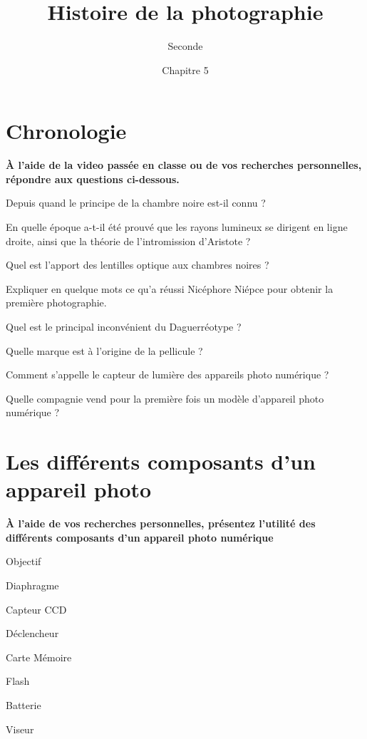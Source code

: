 \documentclass{exos}
\title{Histoire de la photographie}
\author{Seconde}
\date{Chapitre 5}
\begin{document}
\maketitle
\section{Chronologie}
\begin{tcolorbox}
\textbf{À l'aide de la video passée en classe ou de vos recherches personnelles, répondre aux questions ci-dessous.}
\end{tcolorbox}
\begin{alphaquestions}
\item Depuis quand le principe de la chambre noire est-il connu ?
\item En quelle époque a-t-il été prouvé que les rayons lumineux se dirigent en ligne droite, ainsi que la théorie de l'intromission d'Aristote ?
\item Quel est l'apport des lentilles optique aux chambres noires ?
\item Expliquer en quelque mots ce qu'a réussi Nicéphore Niépce pour obtenir la première photographie.
\item Quel est le principal inconvénient du Daguerréotype ?
\item Quelle marque est à l'origine de la pellicule ?
\item Comment s'appelle le capteur de lumière des appareils photo numérique ?
\item Quelle compagnie vend pour la première fois un modèle d'appareil photo numérique ?
\end{alphaquestions}
\section{Les différents composants d'un appareil photo}
\begin{tcolorbox}
\textbf{À l'aide de vos recherches personnelles, présentez l'utilité des différents composants d'un appareil photo numérique}
\end{tcolorbox}
\begin{alphaquestions}
\begin{minipage}{0.45\textwidth}
\item Objectif
\item Diaphragme
\item Capteur CCD
\item Déclencheur
\end{minipage}
\hfill
\begin{minipage}{0.45\textwidth}
\item Carte Mémoire 
\item Flash
\item Batterie
\item Viseur
\end{minipage}
\end{alphaquestions}
\end{document}

